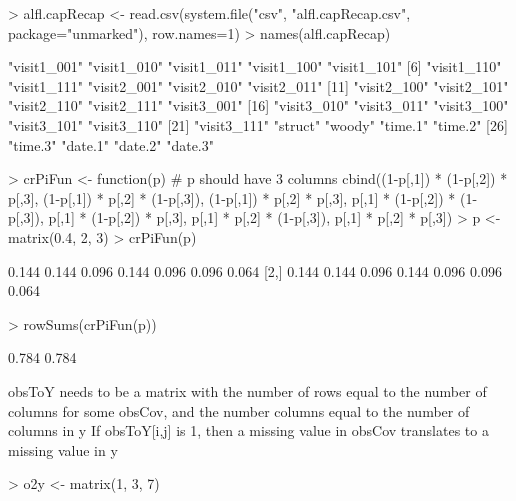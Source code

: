 \documentclass[a4paper]{article}
\renewenvironment{Schunk}{\vspace{\topsep}}{\vspace{\topsep}}
\begin{document}
\begin{Schunk}
\begin{Sinput}
> alfl.capRecap <- read.csv(system.file("csv", "alfl.capRecap.csv", package="unmarked"),
                          row.names=1)
> names(alfl.capRecap)
\end{Sinput}
\begin{Soutput}
 [1] "visit1_001" "visit1_010" "visit1_011" "visit1_100" "visit1_101"
 [6] "visit1_110" "visit1_111" "visit2_001" "visit2_010" "visit2_011"
[11] "visit2_100" "visit2_101" "visit2_110" "visit2_111" "visit3_001"
[16] "visit3_010" "visit3_011" "visit3_100" "visit3_101" "visit3_110"
[21] "visit3_111" "struct"     "woody"      "time.1"     "time.2"    
[26] "time.3"     "date.1"     "date.2"     "date.3"    
\end{Soutput}
\end{Schunk}



\begin{Schunk}
\begin{Sinput}
> crPiFun <- function(p) { # p should have 3 columns
     cbind((1-p[,1]) * (1-p[,2]) * p[,3],
           (1-p[,1]) * p[,2] * (1-p[,3]),
           (1-p[,1]) * p[,2] * p[,3],
           p[,1] * (1-p[,2]) * (1-p[,3]),
           p[,1] * (1-p[,2]) * p[,3],
           p[,1] * p[,2] * (1-p[,3]),
           p[,1] * p[,2] * p[,3])
 }
> p <- matrix(0.4, 2, 3)
> crPiFun(p)
\end{Sinput}
\begin{Soutput}
      [,1]  [,2]  [,3]  [,4]  [,5]  [,6]  [,7]
[1,] 0.144 0.144 0.096 0.144 0.096 0.096 0.064
[2,] 0.144 0.144 0.096 0.144 0.096 0.096 0.064
\end{Soutput}
\begin{Sinput}
> rowSums(crPiFun(p))
\end{Sinput}
\begin{Soutput}
[1] 0.784 0.784
\end{Soutput}
\end{Schunk}


obsToY needs to be a matrix with
the number of rows equal to the number of columns for some obsCov, and
the number columns equal to the number of columns in y
If obsToY[i,j] is 1, then a missing value in obsCov translates to
a missing value in y

\begin{Schunk}
\begin{Sinput}
> o2y <- matrix(1, 3, 7)
\end{Sinput}
\end{Schunk}
\end{document}
